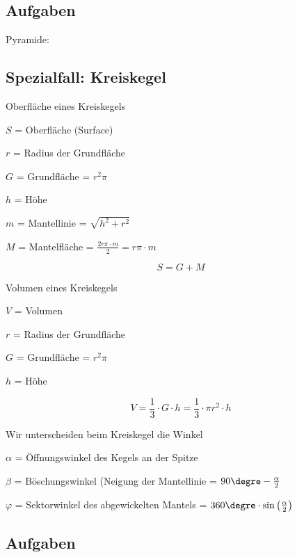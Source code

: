\subsection*{Aufgaben}
Pyramide:
\newpage

\subsection{Spezialfall: Kreiskegel}


\begin{gesetz}{Oberfläche eines Kreiskegels}{}

  $S$ = Oberfläche (Surface)

  $r$ = Radius der Grundfläche
  
  $G$ = Grundfläche = $r^2\pi$

  $h$ = Höhe

  $m$ = Mantellinie = $\sqrt{h^2 + r^2}$
  
  $M$ = Mantelfläche = $\frac{2r\pi \cdot{} m}2 = r\pi\cdot{}m$

  
  $$S = G + M$$
\end{gesetz}


\begin{gesetz}{Volumen eines Kreiskegels}{}

  $V$ = Volumen

  $r$ = Radius der Grundfläche
  
  $G$ = Grundfläche = $r^2\pi$

  $h$ = Höhe

  $$V = \frac13\cdot{} G\cdot{}h = \frac13 \cdot{} \pi r^2 \cdot{} h$$
\end{gesetz}



\begin{bemerkung}{}{}
  Wir unterscheiden beim Kreiskegel die Winkel

  $\alpha$ = Öffnungswinkel des Kegels an der Spitze

  $\beta$ = Böschungswinkel (Neigung der Mantellinie = $90\degre - \frac{\alpha}{2}$

  $\varphi$ = Sektorwinkel des abgewickelten Mantels = $360\degre \cdot \sin\left(\frac{\alpha}2\right)$

\end{bemerkung}
\newpage

\subsection*{Aufgaben}


\newpage

